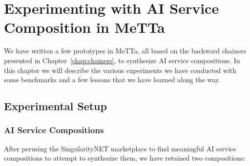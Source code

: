 \documentclass[]{report}
\begin{document}
\chapter{Experimenting with AI Service Composition in MeTTa}
\label{chap:xpaicompo}
We have written a few prototypes in MeTTa, all based on the backward
chainers presented in Chapter~\ref{chap:chainers}, to synthesize AI
service compositions.  In this chapter we will describe the various
experiments we have conducted with some benchmarks and a few lessons
that we have learned along the way.

\section{Experimental Setup}
\label{sec:xpsetup}

\subsection{AI Service Compositions}
\label{sec:aicomp}
After perusing the SingularityNET marketplace to find meaningful AI
service compositions to attempt to synthesize them, we have retained
two compositions:
\end{document}
